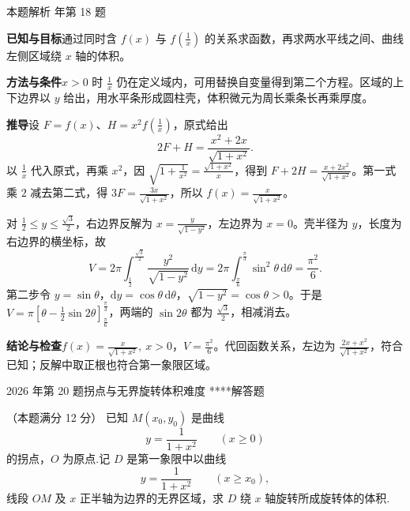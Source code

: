 \documentclass[UTF8,zihao=-4,fontset=fandol]{ctexart}
\newcounter{BankQuestion}
\newcommand{\QuestionPage}[7]{%
  \stepcounter{BankQuestion}%
  \par\noindent\begin{minipage}{\linewidth}
  \raggedright
  {\small\textcolor{black!60}{#3\quad #5\quad 难度 #7}\hfill\textcolor{accent}{#2}}\par\smallskip}
\newcommand{\QuestionEnd}{\end{minipage}\par\medskip}
\newcommand{\QuestionPage}[7]{%
  \clearpage
  \stepcounter{BankQuestion}%
  {\small\textcolor{accent}{#1\hfill #2}}\par\medskip
  {\small\textcolor{black!60}{#3\quad #5\quad 难度 #7\hfill \arabic{BankQuestion} / 234}}\par\vspace{9bp}}
\newcommand{\QuestionEnd}{}
\newenvironment{QuestionSolution}[1]{%
  \clearpage
  {\small\textcolor{black!60}{本题解析\quad #1}}\par\medskip
}{\par\clearpage}
\begin{document}
\begin{QuestionSolution}{2020 年第 18 题}
\textbf{已知与目标}\quad 通过同时含 \(f(x)\) 与 \(f(\frac{1}{x})\) 的关系求函数，再求两水平线之间、曲线左侧区域绕 \(x\) 轴的体积。

\textbf{方法与条件}\quad \(x>0\) 时 \(\frac{1}{x}\) 仍在定义域内，可用替换自变量得到第二个方程。区域的上下边界以 \(y\) 给出，用水平条形成圆柱壳，体积微元为周长乘条长再乘厚度。

\textbf{推导}\quad 设 \(F=f(x)\)、\(H=x^2f(\frac{1}{x})\)，原式给出
\[
2F+H=\frac{x^2+2x}{\sqrt{1+x^2}}.
\]
以 \(\frac{1}{x}\) 代入原式，再乘 \(x^2\)，因 \(\sqrt{1+\frac{1}{x^2}}=\frac{\sqrt{1+x^2}}{x}\)，得到 \(F+2H=\frac{x+2x^2}{\sqrt{1+x^2}}\)。第一式乘 \(2\) 减去第二式，得 \(3F=\frac{3x}{\sqrt{1+x^2}}\)，所以 \(f(x)=\frac{x}{\sqrt{1+x^2}}\)。

对 \(\frac{1}{2}\le y\le\frac{\sqrt3}{2}\)，右边界反解为 \(x=\frac{y}{\sqrt{1-y^2}}\)，左边界为 \(x=0\)。壳半径为 \(y\)，长度为右边界的横坐标，故
\[
V=2\pi\int_{\frac{1}{2}}^{\frac{\sqrt3}{2}}\frac{y^2}{\sqrt{1-y^2}}\,\mathrm{d}y
=2\pi\int_{\frac{\pi}{6}}^{\frac{\pi}{3}}\sin^2\theta\,\mathrm{d}\theta
=\boxed{\frac{\pi^2}{6}}.
\]
第二步令 \(y=\sin\theta\)，\(\mathrm{d}y=\cos\theta\,\mathrm{d}\theta\)，\(\sqrt{1-y^2}=\cos\theta>0\)。于是 \(V=\pi[\theta-\frac{1}{2}\sin2\theta]_{\frac{\pi}{6}}^{\frac{\pi}{3}}\)，两端的 \(\sin2\theta\) 都为 \(\frac{\sqrt3}{2}\)，相减消去。

\textbf{结论与检查}\quad \(\boxed{f(x)=\frac{x}{\sqrt{1+x^2}},\ x>0}\)，\(\boxed{V=\frac{\pi^2}{6}}\)。代回函数关系，左边为 \(\frac{2x+x^2}{\sqrt{1+x^2}}\)，符合已知；反解中取正根也符合第一象限区域。
\end{QuestionSolution}

\QuestionPage{3.4 定积分的应用}{解答题}{2026 年第 20 题}{2}{拐点与无界旋转体积}{188 / 234}{****}
（本题满分 12 分）
已知 \(M(x_0,y_0)\) 是曲线
\[y=\frac{1}{1+x^2}\qquad (x\ge 0)
\]
的拐点，\(O\) 为原点.记 \(D\) 是第一象限中以曲线
\[y=\frac{1}{1+x^2}\qquad (x\ge x_0),
\]
线段 \(OM\) 及 \(x\) 正半轴为边界的无界区域，求 \(D\) 绕 \(x\) 轴旋转所成旋转体的体积.
\QuestionEnd
\end{document}
